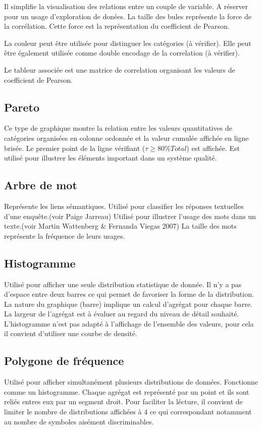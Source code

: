 \documentclass[a4paper,12pt]{article}
\begin{document}
\begin{multicols}{2}
Il simplifie la visualisation des relations entre un couple de variable. A réserver pour un usage d'exploration de donées. \autocite{sosulskiGraphics2019} La taille des bules représente la force de la corrélation. Cette force est la représentation du coefficient de Pearson. \autocite{jonathanschwabishRelationship2021}

La couleur peut être utilisée pour distinguer les catégories (à vérifier). Elle peut être également utilisée comme double encodage de la correlation (à vérifier).

Le tableur associée est une matrice de correlation organisant les valeurs de coefficient de Pearson.
\subsection*{Pareto}
\label{sec:orgf291c24}
Ce type de graphique montre la relation entre les valeurs quantitatives de catégories organisées en colonne ordonnée et la valeur cumulée affichée en ligne brisée. Le premier point de la ligne vérifiant (\(\tau\geq80\%Total\)) est affichée. Est utilisé pour illustrer les éléments important dans un système qualité.
\subsection*{Arbre de mot}
\label{sec:orgccff01c}
Représente les liens sémantiques. Utilisé pour classifier les réponses textuelles d'une enquête.(voir Paige Jarreau) Utilisé pour illustrer l'usage des mots dans un texte.(voir Martin Wattenberg \& Fernanda Viegas 2007) La taille des mots représente la fréquence de leurs usages. \autocite{jonathanschwabishQualitative2021}
\subsection*{Histogramme}
\label{sec:org841a71f}
Utilisé pour afficher une seule distribution statistique de donnée. Il n'y a pas d'espace entre deux barres ce qui permet de favoriser la forme de la distribution. \autocite{alansmithLexiqueVisuel} La nature du graphique (barre) implique un calcul d'agrégat pour chaque barre. La largeur de l'agrégat est à évaluer au regard du niveau de détail souhaité. L'histogramme n'est pas adapté à l'affichage de l'ensemble des valeurs, pour cela il convient d'utiliser une courbe de densité.
\subsection*{Polygone de fréquence}
\label{sec:org853f718}
Utilisé pour afficher simultanément plusieurs distributions de données. Fonctionne comme un histogramme. Chaque agrégat est représenté par un point et ils sont reliés entres eux par un segment droit. Pour faciliter la lécture, il convient de limiter le nombre de distributions affichées à 4 \autocite{alansmithLexiqueVisuel} ce qui correspondant notamment au nombre de symboles aisément discriminables.

\end{multicols}
\end{document}

